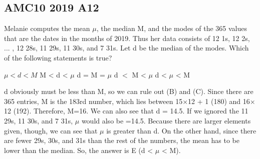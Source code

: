 \documentclass[12pt]{exam}
\begin{document}
\thispagestyle{empty}

\begin{center}\section*{AMC10 2019 A12}

\end{center}
\bigskip
\begin{questions}

\question 
Melanie computes the mean $\mu$, the median M, and the modes of the 365 values 
that are the dates in the months of 2019. 
Thus her data consists of 12 1s, 12 2s, ... , 12 28s, 11 29s, 11 30s, and 7 31s. 
Let d be the median of the modes. 
Which of the following statements is true?
\bigskip

\begin{oneparchoices}
    \choice $\mu < d < M$
    \choice M < d < $\mu$
    \choice d = M = $\mu$
    \choice d $<$ M < $\mu$
    \choice d < $\mu$ < M
\end{oneparchoices}

\vspace{0.5cm}
d obviously must be less than M, 
so we can rule out (B) and (C). 
Since there are 365 entries, M is the 183rd number, 
which lies between 15$\times$12 + 1 (180) and 16$\times$12 (192). 
Therefore, M=16. We can also see that d = 14.5. 
If we ignored the 11 29s, 11 30s, and 7 31s, 
$\mu$ would also be =14.5. Because there are larger elements given, 
though, we can see that $\mu$ is greater than d. 
On the other hand, since there are fewer 29s, 30s, and 31s than the rest of the numbers,
 the mean has to be lower than the median. 
 So, the answer is E (d < $\mu$ < M).

\end{questions}
\end{document}
